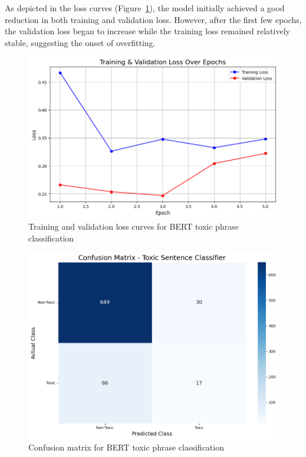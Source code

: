 \documentclass[conference]{IEEEtran}
\begin{document}
As depicted in the loss curves (Figure~\ref{fig:bert_loss_toxic}), the model initially achieved a good reduction in both training and validation loss. However, after the first few epochs, the validation loss began to increase while the training loss remained relatively stable, suggesting the onset of overfitting.

\begin{figure}[H]
  \centering
  \includegraphics[width=\columnwidth]{figures/bert_toxic_loss_curves.png}
  \caption{Training and validation loss curves for BERT toxic phrase classification}
  \label{fig:bert_loss_toxic}
\end{figure}

\begin{figure}[H]
  \centering
  \includegraphics[width=\columnwidth]{figures/bert_toxic_confusion_matrix.png}
  \caption{Confusion matrix for BERT toxic phrase classification}
  \label{fig:bert_cm_toxic}
\end{figure}
\end{document}
